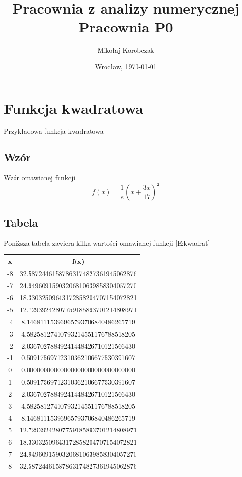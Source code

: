 \documentclass[11pt,wide]{mwart}
\date{Wrocław, \today}
\title{\LARGE\textbf{Pracownia z analizy numerycznej}\\Pracownia P0}
\author{Mikołaj Korobczak}
\begin{document}
\maketitle
\thispagestyle{empty}
\tableofcontents

\section{Funkcja kwadratowa}
Przykładowa funkcja kwadratowa
\subsection{Wzór}
Wzór omawianej funkcji:
\begin{equation}\label{E:kwadrat}
f(x) = \frac{1}{e}(x + \frac{3x}{17})^2
\end{equation}

\subsection{Tabela}
Poniższa tabela zawiera kilka wartości omawianej funkcji \eqref{E:kwadrat}
\begin{center}

	\begin{tabular}{|c|c|} \hline
	x & f(x) \\ \hline
	-8	&	32.58724461587863174827361945062876\\
	-7	&	24.94960915903206810639858304057270\\
	-6	&	18.33032509643172858204707154072821\\
	-5	&	12.72939242807759185893701214808971\\
	-4	&	8.14681115396965793706840486265719\\
	-3	&	4.58258127410793214551176788518205\\
	-2	&	2.03670278849241448426710121566430\\
	-1	&	0.50917569712310362106677530391607\\
	0	&	0.00000000000000000000000000000000\\
	1	&	0.50917569712310362106677530391607\\
	2	&	2.03670278849241448426710121566430\\
	3	&	4.58258127410793214551176788518205\\
	4	&	8.14681115396965793706840486265719\\
	5	&	12.72939242807759185893701214808971\\
	6	&	18.33032509643172858204707154072821\\
	7	&	24.94960915903206810639858304057270\\
	8	&	32.58724461587863174827361945062876\\ \hline
	\end{tabular}
	

\end{center}
\end{document}
